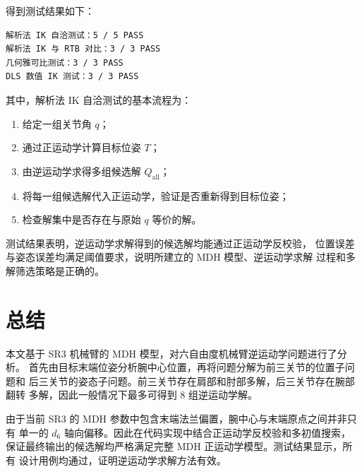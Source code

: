\documentclass[UTF8,a4paper,12pt]{ctexart}
\begin{document}
得到测试结果如下：

\begin{lstlisting}
解析法 IK 自洽测试：5 / 5 PASS
解析法 IK 与 RTB 对比：3 / 3 PASS
几何雅可比测试：3 / 3 PASS
DLS 数值 IK 测试：3 / 3 PASS
\end{lstlisting}

其中，解析法 IK 自洽测试的基本流程为：

\begin{enumerate}
    \item 给定一组关节角 $q$；
    \item 通过正运动学计算目标位姿 $T$；
    \item 由逆运动学求得多组候选解 $Q_{\mathrm{all}}$；
    \item 将每一组候选解代入正运动学，验证是否重新得到目标位姿；
    \item 检查解集中是否存在与原始 $q$ 等价的解。
\end{enumerate}

测试结果表明，逆运动学求解得到的候选解均能通过正运动学反校验，
位置误差与姿态误差均满足阈值要求，说明所建立的 MDH 模型、逆运动学求解
过程和多解筛选策略是正确的。

\section{总结}

本文基于 SR3 机械臂的 MDH 模型，对六自由度机械臂逆运动学问题进行了分析。
首先由目标末端位姿分析腕中心位置，再将问题分解为前三关节的位置子问题和
后三关节的姿态子问题。前三关节存在肩部和肘部多解，后三关节存在腕部翻转
多解，因此一般情况下最多可得到 8 组逆运动学解。

由于当前 SR3 的 MDH 参数中包含末端法兰偏置，腕中心与末端原点之间并非只有
单一的 $d_6$ 轴向偏移。因此在代码实现中结合正运动学反校验和多初值搜索，
保证最终输出的候选解均严格满足完整 MDH 正运动学模型。测试结果显示，所有
设计用例均通过，证明逆运动学求解方法有效。
\end{document}

